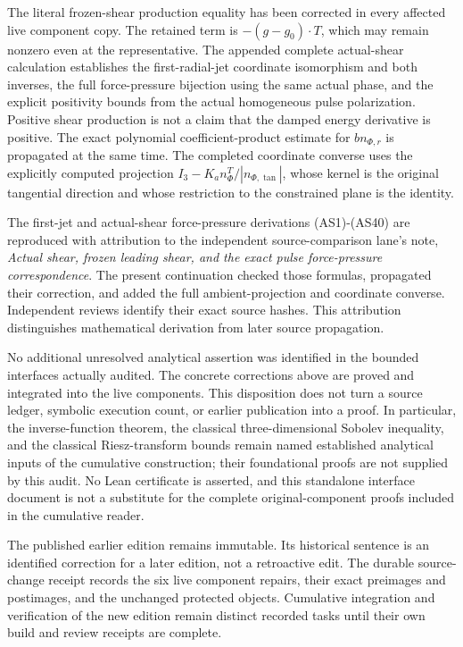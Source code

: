\documentclass[10pt,a4paper]{article}
\begin{document}
The literal frozen-shear production equality has been corrected in every affected live component copy. The retained term is \(-(g-g_0)\cdot T\), which may remain nonzero even at the representative. The appended complete actual-shear calculation establishes the first-radial-jet coordinate isomorphism and both inverses, the full force-pressure bijection using the same actual phase, and the explicit positivity bounds from the actual homogeneous pulse polarization. Positive shear production is not a claim that the damped energy derivative is positive. The exact polynomial coefficient-product estimate for \(bn_{\Phi,r}\) is propagated at the same time. The completed coordinate converse uses the explicitly computed projection \(I_3-K_an_\Phi^T/|n_{\Phi,\tan}|\), whose kernel is the original tangential direction and whose restriction to the constrained plane is the identity.

The first-jet and actual-shear force-pressure derivations (AS1)-(AS40) are reproduced with attribution to the independent source-comparison lane's note, \emph{Actual shear, frozen leading shear, and the exact pulse force-pressure correspondence}. The present continuation checked those formulas, propagated their correction, and added the full ambient-projection and coordinate converse. Independent reviews identify their exact source hashes. This attribution distinguishes mathematical derivation from later source propagation.

No additional unresolved analytical assertion was identified in the bounded interfaces actually audited. The concrete corrections above are proved and integrated into the live components. This disposition does not turn a source ledger, symbolic execution count, or earlier publication into a proof. In particular, the inverse-function theorem, the classical three-dimensional Sobolev inequality, and the classical Riesz-transform bounds remain named established analytical inputs of the cumulative construction; their foundational proofs are not supplied by this audit. No Lean certificate is asserted, and this standalone interface document is not a substitute for the complete original-component proofs included in the cumulative reader.

The published earlier edition remains immutable. Its historical sentence is an identified correction for a later edition, not a retroactive edit. The durable source-change receipt records the six live component repairs, their exact preimages and postimages, and the unchanged protected objects. Cumulative integration and verification of the new edition remain distinct recorded tasks until their own build and review receipts are complete.
\end{document}

